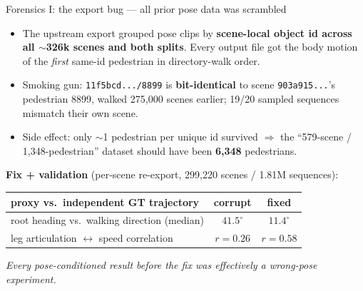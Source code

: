 \documentclass[10pt,aspectratio=169]{beamer}
\newcommand{\ok}[1]{\textcolor{good}{#1}}
\begin{document}
\begin{frame}{Forensics I: the export bug --- all prior pose data was scrambled}
\begin{itemize}
  \item The upstream export grouped pose clips by \textbf{scene-local object id across all
        $\sim$326k scenes and both splits}. Every output file got the body motion of the
        \emph{first} same-id pedestrian in directory-walk order.
  \item Smoking gun: \texttt{11f5bcd.../8899} is \textbf{bit-identical} to scene
        \texttt{903a915...}'s pedestrian 8899, walked 275{,}000 scenes earlier; 19/20
        sampled sequences mismatch their own scene.
  \item Side effect: only $\sim$1 pedestrian per unique id survived $\Rightarrow$ the
        ``579-scene / 1{,}348-pedestrian'' dataset should have been \textbf{6{,}348} pedestrians.
\end{itemize}
\vspace{0.4em}
\textbf{Fix + validation} (per-scene re-export, 299{,}220 scenes / 1.81M sequences):
\begin{center}\small
\begin{tabular}{lcc}
\toprule
proxy vs.\ independent GT trajectory & corrupt & \textbf{fixed} \\
\midrule
root heading vs.\ walking direction (median) & $41.5^\circ$ & \ok{$11.4^\circ$} \\
leg articulation $\leftrightarrow$ speed correlation & $r{=}0.26$ & \ok{$r{=}0.58$} \\
\bottomrule
\end{tabular}
\end{center}
\emph{Every pose-conditioned result before the fix was effectively a wrong-pose experiment.}
\end{frame}
\end{document}
